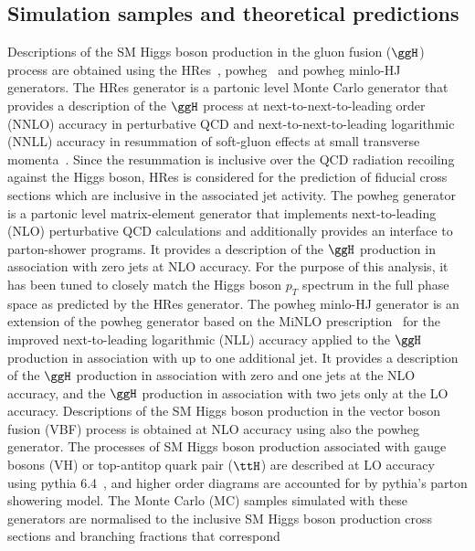 \subsection{Simulation samples and theoretical predictions} \label{sec:Simulations}
Descriptions of the SM Higgs boson production in the gluon fusion ($\ggH$) process are obtained using 
the {\sc HRes}~\cite{deFlorian:2012mx, Grazzini:2013mca}, {\sc powheg}~\cite{powheg, powhegvv} and {\sc powheg minlo-HJ}~\cite{Hamilton:2012np} generators.
The {\sc HRes} generator is a partonic level Monte Carlo generator that provides a description of the $\ggH$ process at next-to-next-to-leading order 
(NNLO) accuracy in perturbative QCD and next-to-next-to-leading logarithmic (NNLL) accuracy in resummation of soft-gluon effects at small transverse 
momenta~\cite{deFlorian:2012mx, Grazzini:2013mca}. Since the resummation is inclusive over the QCD radiation recoiling against the Higgs
boson, {\sc HRes} is considered for the prediction of fiducial cross sections which are inclusive in the associated jet activity.
The {\sc powheg} generator is a partonic level matrix-element generator that implements next-to-leading (NLO) perturbative QCD calculations and 
additionally provides an interface to parton-shower programs. It provides a description of the $\ggH$ production in association with zero jets at NLO
accuracy. For the purpose of this analysis, it has been tuned to closely match the Higgs boson $p_{T}$ spectrum in the full phase space as predicted by
the {\sc HRes} generator. The {\sc powheg minlo-HJ} generator is an extension of the {\sc powheg} generator based on the MiNLO 
prescription~\cite{Hamilton:2012np} for the improved next-to-leading logarithmic (NLL) accuracy applied to the $\ggH$ production in association with up to
one additional jet. It provides a description of the $\ggH$ production in association with zero and one jets at the NLO accuracy, and the $\ggH$ production
in association with two jets only at the LO accuracy. Descriptions of the SM Higgs boson production in the vector boson fusion (VBF) process is obtained at
 NLO accuracy using also the {\sc powheg} generator.
The processes of SM Higgs boson production associated with gauge bosons (VH) or top-antitop quark pair ($\ttH$) are described at LO accuracy 
using {\sc pythia 6.4}~\cite{Sjostrand:2006za}, and higher order diagrams are accounted for by {\sc pythia}'s parton showering model. The Monte Carlo (MC) 
samples simulated with these generators are normalised to the inclusive SM Higgs boson production cross sections and branching fractions that correspond 

